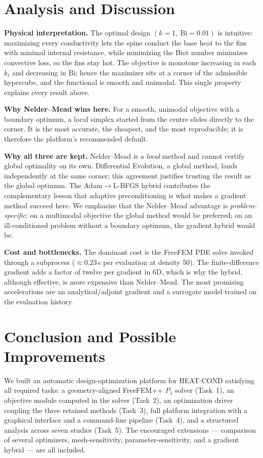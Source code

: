 \documentclass[11pt,a4paper]{article}
\begin{document}
\section{Analysis and Discussion}
\textbf{Physical interpretation.} The optimal design $(k=1,\ \mathrm{Bi}=0.01)$ is intuitive:
maximizing every conductivity lets the spine conduct the base heat to the fins with minimal internal
resistance, while minimizing the Biot number minimizes convective loss, so the fins stay hot. The
objective is monotone increasing in each $k_i$ and decreasing in $\mathrm{Bi}$; hence the maximizer
sits at a corner of the admissible hypercube, and the functional is smooth and unimodal. This single
property explains every result above.

\textbf{Why Nelder--Mead wins here.} For a smooth, unimodal objective with a boundary optimum, a
local simplex started from the centre slides directly to the corner. It is the most accurate, the
cheapest, and the most reproducible; it is therefore the platform's recommended default.

\textbf{Why all three are kept.} Nelder--Mead is a \emph{local} method and cannot certify global
optimality on its own. Differential Evolution, a global method, lands independently at the same
corner; this agreement justifies trusting the result as the global optimum. The
Adam$\rightarrow$L-BFGS hybrid contributes the complementary lesson that adaptive preconditioning is
what makes a gradient method succeed here. We emphasize that the Nelder--Mead advantage is
\emph{problem-specific}: on a multimodal objective the global method would be preferred; on an
ill-conditioned problem without a boundary optimum, the gradient hybrid would be.

\textbf{Cost and bottlenecks.} The dominant cost is the FreeFEM PDE solve invoked through a
subprocess ($\approx0.23$\,s per evaluation at density 50). The finite-difference gradient adds a
factor of twelve per gradient in 6D, which is why the hybrid, although effective, is more expensive
than Nelder--Mead. The most promising accelerations are an analytical/adjoint gradient and a
surrogate model trained on the evaluation history.

\section{Conclusion and Possible Improvements}
We built an automatic design-optimization platform for HEAT-COND satisfying all required tasks: a
geometry-aligned FreeFEM++ $P_1$ solver (Task~1), an objective module computed in the solver
(Task~2), an optimization driver coupling the three retained methods (Task~3), full platform
integration with a graphical interface and a command-line pipeline (Task~4), and a structured
analysis across seven studies (Task~5). The encouraged extensions --- comparison of several
optimizers, mesh-sensitivity, parameter-sensitivity, and a gradient hybrid --- are all included.
\end{document}
